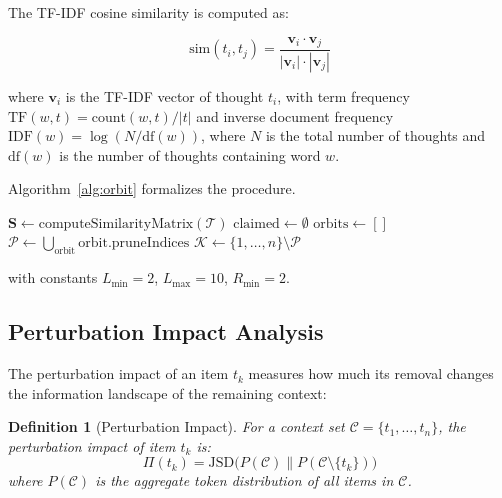 \documentclass[journal,10pt]{IEEEtran}
\newtheorem{definition}{Definition}
\begin{document}
The TF-IDF cosine similarity is computed as:

\begin{equation}
\text{sim}(t_i, t_j) = \frac{\mathbf{v}_i \cdot \mathbf{v}_j}{|\mathbf{v}_i| \cdot |\mathbf{v}_j|}
\label{eq:cosine}
\end{equation}

\noindent where $\mathbf{v}_i$ is the TF-IDF vector of thought $t_i$, with term frequency $\text{TF}(w, t) = \text{count}(w, t) / |t|$ and inverse document frequency $\text{IDF}(w) = \log(N / \text{df}(w))$, where $N$ is the total number of thoughts and $\text{df}(w)$ is the number of thoughts containing word $w$.

Algorithm~\ref{alg:orbit} formalizes the procedure.

\begin{algorithm}[!t]
\caption{Orbit Compression}\label{alg:orbit}
\SetAlgoLined
{}
$\mathbf{S} \leftarrow \text{computeSimilarityMatrix}(\mathcal{T})$\;
$\text{claimed} \leftarrow \emptyset$\;
$\text{orbits} \leftarrow []$\;
\For{$L \leftarrow \min(L_{\max}, \lfloor n/2 \rfloor)$ \KwTo $L_{\min}$}{
  \For{$s \leftarrow 0$ \KwTo $n - L \cdot R_{\min}$}{
    \If{$\exists k \in [s, s+L): k \in \text{claimed}$}{\textbf{continue}}
    $(r, \bar{S}) \leftarrow \text{detectRepetitions}(\mathbf{S}, s, L, \tau)$\;
    \If{$r \geq R_{\min}$}{
      $\text{claimed} \leftarrow \text{claimed} \cup \{s, \ldots, s + r \cdot L - 1\}$\;
      $\text{orbits.push}(s, L, r, \bar{S})$\;
    }
  }
}
$\mathcal{P} \leftarrow \bigcup_{\text{orbit}} \text{orbit.pruneIndices}$\;
$\mathcal{K} \leftarrow \{1, \ldots, n\} \setminus \mathcal{P}$\;
\end{algorithm}

\noindent with constants $L_{\min} = 2$, $L_{\max} = 10$, $R_{\min} = 2$.

\subsection{Perturbation Impact Analysis}
\label{sec:perturbation}

The perturbation impact of an item $t_k$ measures how much its removal changes the information landscape of the remaining context:

\begin{definition}[Perturbation Impact]
\label{def:perturbation}
For a context set $\mathcal{C} = \{t_1, \ldots, t_n\}$, the perturbation impact of item $t_k$ is:
\begin{equation}
\Pi(t_k) = \text{JSD}\bigl(P(\mathcal{C}) \| P(\mathcal{C} \setminus \{t_k\})\bigr)
\label{eq:perturbation}
\end{equation}
where $P(\mathcal{C})$ is the aggregate token distribution of all items in $\mathcal{C}$.
\end{definition}
\end{document}
